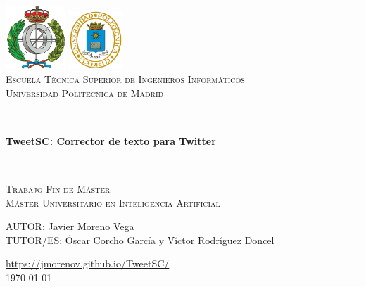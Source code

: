 \documentclass[spanish,12pt, a4paper,twoside]{paper}
\begin{document}
\begin{titlepage}

\newcommand{\HRule}{\rule{\linewidth}{0.5mm}} %

\center %
 
\includegraphics[width=2.25cm]{recursos/logoFi.png}
  \hspace{8cm}
\includegraphics[width=2cm]{recursos/logoupm.png}
\\[1cm]

\textsc{\Large Escuela Técnica Superior de Ingenieros Informáticos}\\[0.5cm]
\textsc{\large Universidad Polítecnica de Madrid}
\\[3cm]


 \HRule \\[0.4cm]
{ \huge \bfseries TweetSC: Corrector de texto para Twitter}\\[0.4cm] %
\HRule \\[2.5cm]

\textsc{\LARGE Trabajo Fin de Máster}\\[0.5cm] 
\textsc{\Large Máster Universitario en Inteligencia Artificial }\\[2.5cm]

\begin{flushright}
\large
AUTOR: Javier Moreno Vega\\
TUTOR/ES: Óscar Corcho García y \linebreak
                    Víctor Rodríguez Doncel
\end{flushright}


{{\url{https://jmorenov.github.io/TweetSC/}}}\\[1cm]


{ {\today}}\\[1cm]

\vfill %

\end{titlepage}
\end{document}
